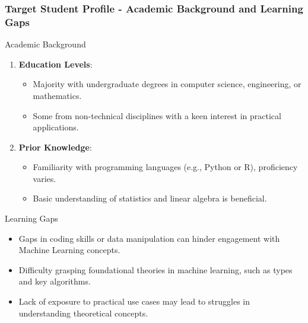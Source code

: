 \documentclass[aspectratio=169]{beamer}
\begin{document}
\begin{frame}[fragile]
    \frametitle{Target Student Profile - Academic Background and Learning Gaps}
    \begin{block}{Academic Background}
        \begin{enumerate}
            \item \textbf{Education Levels}:
                \begin{itemize}
                    \item Majority with undergraduate degrees in computer science, engineering, or mathematics.
                    \item Some from non-technical disciplines with a keen interest in practical applications.
                \end{itemize}
            \item \textbf{Prior Knowledge}:
                \begin{itemize}
                    \item Familiarity with programming languages (e.g., Python or R), proficiency varies.
                    \item Basic understanding of statistics and linear algebra is beneficial.
                \end{itemize}
        \end{enumerate}
    \end{block}

    \begin{block}{Learning Gaps}
        \begin{itemize}
            \item Gaps in coding skills or data manipulation can hinder engagement with Machine Learning concepts.
            \item Difficulty grasping foundational theories in machine learning, such as types and key algorithms.
            \item Lack of exposure to practical use cases may lead to struggles in understanding theoretical concepts.
        \end{itemize}
    \end{block}
\end{frame}
\end{document}
